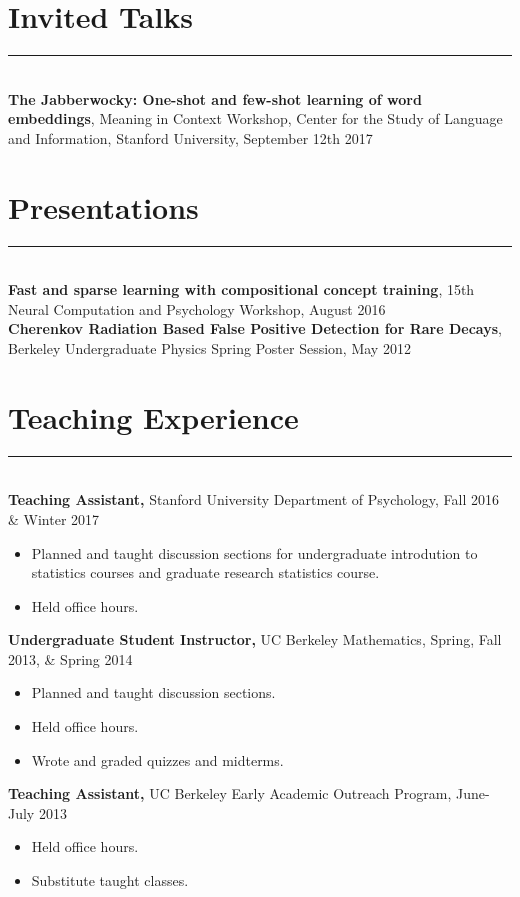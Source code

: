 \documentclass[margin]{res}
\begin{document}
\begin{resume}
\vspace{1pt}\section{Invited Talks} \vspace{-15pt} \rule{\textwidth}{0.5pt} \\[3pt]
{\bf The Jabberwocky: One-shot and few-shot learning of word embeddings}, Meaning in Context Workshop, Center for the Study of Language and Information,  Stanford University, September 12th 2017 
 
\vspace{1pt}\section{Presentations} \vspace{-15pt} \rule{\textwidth}{0.5pt} \\[3pt]
{\bf Fast and sparse learning with compositional concept training}, 15th Neural Computation and Psychology Workshop, August 2016\\[3pt]
{\bf Cherenkov Radiation Based False Positive Detection for Rare Decays}, Berkeley Undergraduate Physics Spring Poster Session, May 2012

\vspace{1pt}\section{Teaching Experience} \vspace{-15pt} \rule{\textwidth}{0.5pt} \\[3pt]
{\bf Teaching Assistant,} Stanford University Department of Psychology, Fall 2016 \& Winter 2017
\begin{itemize} \itemsep -2pt
  \item Planned and taught discussion sections for undergraduate introdution to statistics courses and graduate research statistics course. \item Held office hours. \end{itemize}\vspace{-8pt}
{\bf Undergraduate Student Instructor,} UC Berkeley Mathematics, Spring, Fall 2013, \& Spring 2014 
\begin{itemize} \itemsep -2pt
  \item Planned and taught discussion sections. \item Held office hours. \item Wrote and graded quizzes and midterms. \end{itemize}\vspace{-8pt}
{\bf Teaching Assistant,} UC Berkeley Early Academic Outreach Program, June-July 2013
\begin{itemize} \itemsep -2pt
 \item Held office hours. \item Substitute taught classes. \end{itemize}


\end{resume}
\end{document}
